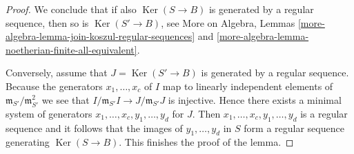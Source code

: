 \documentclass{stacks-project}
\theoremstyle{plain}
\theoremstyle{definition}
\theoremstyle{remark}
\numberwithin{equation}{subsection}
\def\Ker{\mathop{\mathrm{Ker}}}
\begin{document}
\begin{proof}
\medskip\noindent
We conclude that if also $\Ker(S \to B)$ is generated by a
regular sequence, then so is $\Ker(S' \to B)$, see
More on Algebra, Lemmas
\ref{more-algebra-lemma-join-koszul-regular-sequences} and
\ref{more-algebra-lemma-noetherian-finite-all-equivalent}.

\medskip\noindent
Conversely, assume that $J = \Ker(S' \to B)$ is generated
by a regular sequence. Because the generators $x_1, \ldots, x_c$
of $I$ map to linearly independent elements of
$\mathfrak m_{S'}/\mathfrak m_{S'}^2$ we see that
$I/\mathfrak m_{S'}I \to J/\mathfrak m_{S'}J$ is injective.
Hence there exists a minimal system of generators
$x_1, \ldots, x_c, y_1, \ldots, y_d$ for $J$.
Then $x_1, \ldots, x_c, y_1, \ldots, y_d$ is a regular sequence
and it follows that the images of $y_1, \ldots, y_d$ in $S$
form a regular sequence generating $\Ker(S \to B)$.
This finishes the proof of the lemma.
\end{proof}
\end{document}
